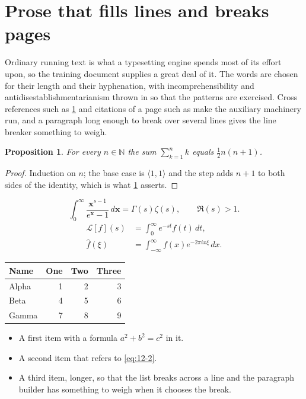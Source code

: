 \documentclass[11pt,a4paper]{report}
\theoremstyle{plain}
\newtheorem{proposition}{Proposition}[chapter]
\newcommand{\vecn}[1]{\mathbf{#1}}
\newcommand{\pairs}[2]{\langle #1,#2\rangle}
\begin{document}
\section{Prose that fills lines and breaks pages}
\label{sec:prose12-2}
Ordinary running text is what a typesetting engine spends most of its effort
upon, so the training document supplies a great deal of it. The words are
chosen for their length and their hyphenation, with incomprehensibility and
antidisestablishmentarianism thrown in so that the patterns are exercised.
Cross references such as \cref{sec:prose12-2} and citations of a page such
as \pageref{sec:prose12-2} make the auxiliary machinery run, and a
paragraph long enough to break over several lines gives the line breaker
something to weigh.
\begin{proposition}\label{prop:12-2}
For every $n\in\mathbb{N}$ the sum $\sum_{k=1}^{n}k$ equals
$\tfrac{1}{2}n(n+1)$.
\end{proposition}
\begin{proof}
Induction on $n$; the base case is $\pairs{1}{1}$ and the step adds $n+1$ to
both sides of the identity, which is what \cref{prop:12-2} asserts.
\end{proof}
\begin{equation}\label{eq:12-2}
  \int_{0}^{\infty}\frac{\vecn{x}^{s-1}}{e^{\vecn{x}}-1}\,d\vecn{x}
    = \Gamma(s)\zeta(s),\qquad \Re(s)>1 .
\end{equation}
\begin{align}
  \mathcal{L}[f](s) &= \int_{0}^{\infty} e^{-st} f(t)\,dt, \\
  \widehat{f}(\xi)  &= \int_{-\infty}^{\infty} f(x) e^{-2\pi i x\xi}\,dx .
\end{align}
\par\noindent\begin{center}
\begin{tabular}{lrrr}
\hline
Name & One & Two & Three \\
\hline
Alpha & 1 & 2 & 3 \\
Beta & 4 & 5 & 6 \\
Gamma & 7 & 8 & 9 \\
\hline
\end{tabular}
\end{center}
\begin{itemize}
  \item A first item with a formula $a^2+b^2=c^2$ in it.
  \item A second item that refers to \eqref{eq:12-2}.
  \item A third item, longer, so that the list breaks across a line and the
    paragraph builder has something to weigh when it chooses the break.
\end{itemize}
\end{document}
